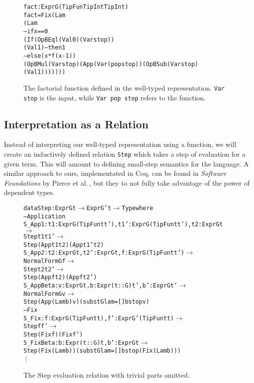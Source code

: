 \begin{figure}
\begin{alltt}
fact : Expr G (TipFun TipInt TipInt)
fact = Fix (Lam 
             (Lam 
                -- if x == 0
                (If (OpB Eql (Val 0) (Var stop))
                  (Val 1) -- then 1
                  -- else (x * f (x - 1))
                  (OpB Mul (Var stop) (App (Var (pop stop)) (OpB Sub (Var stop) (Val 1))))))) 
\end{alltt}
\caption{The factorial function defined in the well-typed representation. \texttt{Var stop} is the input, while \texttt{Var pop stop} refers to the function.}
\end{figure}

\subsection{Interpretation as a Relation}
Instead of interpreting our well-typed representation using a function, we will create an inductively defined relation \texttt{Step} which takes a step of evaluation for a given term. This will amount to defining small-step semantics for the language. A similar approach to ours, implementated in Coq, can be found in \textit{Software Foundations} by Pierce et al.\,\cite{Pierce:SF}, but they to not fully take advantage of the power of dependent types.

\begin{figure}
\begin{alltt}
  data Step : Expr G t \(\rightarrow\) Expr G' t \(\rightarrow\) Type where
      -- Application
      S_App1    : {t1: Expr G (TipFun t t'), t1': Expr G (TipFun t t'), t2: Expr G t} \(\rightarrow\)
                  Step t1 t1' \(\rightarrow\)
                  Step (App t1 t2) (App t1' t2)
      S_App2    : {t2: Expr G t, t2': Expr G t, f: Expr G (TipFun t t')} \(\rightarrow\)
                  NormalForm G f \(\rightarrow\)
                  Step t2 t2' \(\rightarrow\)
                  Step (App f t2) (App f t2')
      S_AppBeta : {v: Expr G t, b: Expr (t :: G) t', b': Expr G t'} \(\rightarrow\)
                  NormalForm G v \(\rightarrow\)
                  Step (App (Lam b) v) (subst {Glam=[]} b stop v)
      -- Fix
      S_Fix     : {f: Expr G (TipFun t t), f': Expr G' (TipFun t t)} \(\rightarrow\)
                  Step f f' \(\rightarrow\)
                  Step (Fix f) (Fix f')
      S_FixBeta : {b: Expr (t :: G) t, b': Expr G t} \(\rightarrow\)
                  Step (Fix (Lam b)) (subst {Glam=[]} b stop (Fix (Lam b)))
      \vdots
\end{alltt}
\caption{The Step evaluation relation with trivial parts omitted.}
\label{fig:step-relation}
\end{figure}

